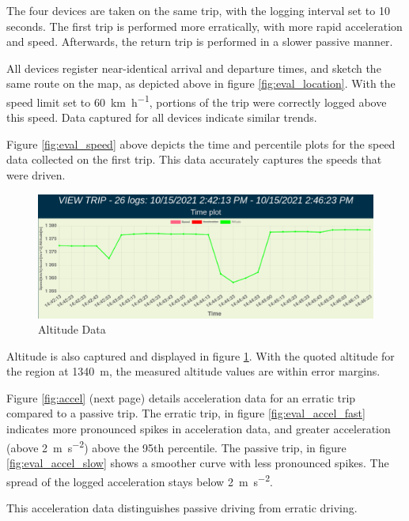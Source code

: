 The four devices are taken on the same trip, with the logging interval set to 10 seconds.
The first trip is performed more erratically, with more rapid acceleration and speed.
Afterwards, the return trip is performed in a slower passive manner.

All devices register near-identical arrival and departure times, and sketch the same route on the map, as depicted above in figure \ref{fig:eval_location}.
With the speed limit set to \SI{60}{\kilo\meter\per\hour}, portions of the trip were correctly logged above this speed.
Data captured for all devices indicate similar trends.

Figure \ref{fig:eval_speed} above depicts the time and percentile plots for the speed data collected on the first trip.
This data accurately captures the speeds that were driven.

\begin{figure}[H]
\centering
\includegraphics[width=5in]{eval_altitude.png}
\caption{Altitude Data}
\label{fig:eval_altitude}
\end{figure}

Altitude is also captured and displayed in figure \ref{fig:eval_altitude}.
With the quoted altitude for the region at \SI{1340}{ \metre }, the measured altitude values are within error margins.

Figure \ref{fig:accel} (next page) details acceleration data for an erratic trip compared to a passive trip.
The erratic trip, in figure \ref{fig:eval_accel_fast} indicates more pronounced spikes in acceleration data, and greater acceleration (above \SI{2}{\metre \per \square \second}) above the 95th percentile.
The passive trip, in figure \ref{fig:eval_accel_slow} shows a smoother curve with less pronounced spikes. The spread of the logged acceleration stays below \SI{2}{\metre \per \square \second}.

This acceleration data distinguishes passive driving from erratic driving.

